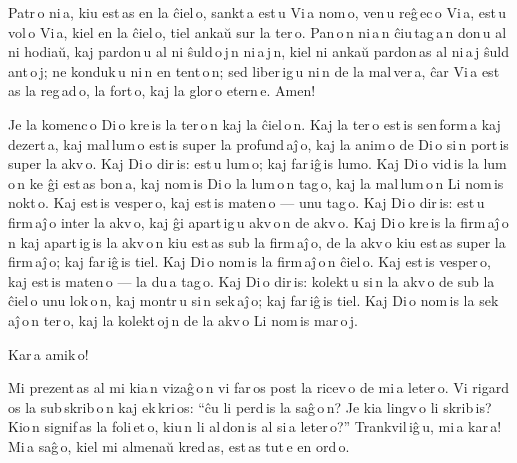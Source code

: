
Patr\,o ni\,a, kiu est\,as en la ĉiel\,o, sankt\,a est\,u Vi\,a nom\,o, ven\,u reĝ\,ec\,o Vi\,a, est\,u vol\,o Vi\,a, kiel en la ĉiel\,o, tiel ankaŭ sur la ter\,o. Pan\,o\,n ni\,a\,n ĉiu\,tag\,a\,n don\,u al ni hodiaŭ, kaj pardon\,u al ni ŝuld\,o\,j\,n ni\,a\,j\,n, kiel ni ankaŭ pardon\,as al ni\,a\,j ŝuld\,ant\,o\,j; ne konduk\,u ni\,n en tent\,o\,n; sed liber\,ig\,u ni\,n de la mal\,ver\,a, ĉar Vi\,a est\,as la reg\,ad\,o, la fort\,o, kaj la glor\,o etern\,e. Amen!


Je la komenc\,o Di\,o kre\,is la ter\,o\,n kaj la ĉiel\,o\,n. Kaj la ter\,o est\,is sen\,form\,a kaj dezert\,a, kaj mal\,lum\,o est\,is super la profund\,aĵ\,o, kaj la anim\,o de Di\,o si\,n port\,is super la akv\,o. Kaj Di\,o dir\,is: est\,u lum\,o; kaj far\,iĝ\,is lumo. Kaj Di\,o vid\,is la lum\,o\,n ke ĝi est\,as bon\,a, kaj nom\,is Di\,o la lum\,o\,n tag\,o, kaj la mal\,lum\,o\,n Li nom\,is nokt\,o. Kaj est\,is vesper\,o, kaj est\,is maten\,o --- unu tag\,o. Kaj Di\,o dir\,is: est\,u firm\,aĵ\,o inter la akv\,o, kaj ĝi apart\,ig\,u akv\,o\,n de akv\,o. Kaj Di\,o kre\,is la firm\,aĵ\,o\,n kaj apart\,ig\,is la akv\,o\,n kiu est\,as sub la firm\,aĵ\,o, de la akv\,o kiu est\,as super la firm\,aĵ\,o; kaj far\,iĝ\,is tiel. Kaj Di\,o nom\,is la firm\,aĵ\,o\,n ĉiel\,o. Kaj est\,is vesper\,o, kaj est\,is maten\,o --- la du\,a tag\,o. Kaj Di\,o dir\,is: kolekt\,u si\,n la akv\,o de sub la ĉiel\,o unu lok\,o\,n, kaj montr\,u si\,n sek\,aĵ\,o; kaj far\,iĝ\,is tiel. Kaj Di\,o nom\,is la sek\,aĵ\,o\,n ter\,o, kaj la kolekt\,oj\,n de la akv\,o Li nom\,is mar\,o\,j.


\hspace{5em} Kar\,a amik\,o!

Mi prezent\,as al mi kia\,n vizaĝ\,o\,n vi far\,os post la ricev\,o de mi\,a leter\,o. Vi rigard\,os la sub\,skrib\,o\,n kaj ek\,kri\,os: “ĉu li perd\,is la saĝ\,o\,n? Je kia lingv\,o li skrib\,is? Kio\,n signif\,as la foli\,et\,o, kiu\,n li al\,don\,is al si\,a leter\,o?” Trankvil\,iĝ\,u, mi\,a kar\,a! Mi\,a saĝ\,o, kiel mi almenaŭ kred\,as, est\,as tut\,e en ord\,o.

